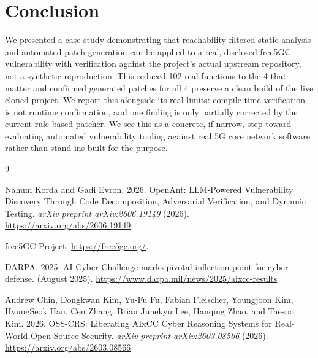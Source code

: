\documentclass[sigconf]{acmart}
\begin{document}
\section{Conclusion}

We presented a case study demonstrating that reachability-filtered
static analysis and automated patch generation can be applied to a
real, disclosed free5GC vulnerability with verification against the
project's actual upstream repository, not a synthetic reproduction.
This reduced 102 real functions to the 4 that matter and confirmed
generated patches for all 4 preserve a clean build of the live cloned
project. We report this alongside its real limits: compile-time
verification is not runtime confirmation, and one finding is only
partially corrected by the current rule-based patcher. We see this as
a concrete, if narrow, step toward evaluating automated vulnerability
tooling against real 5G core network software rather than stand-ins
built for the purpose.

\begin{thebibliography}{9}

Nahum Korda and Gadi Evron. 2026. OpenAnt: LLM-Powered Vulnerability
Discovery Through Code Decomposition, Adversarial Verification, and
Dynamic Testing. \textit{arXiv preprint arXiv:2606.19149} (2026).
\url{https://arxiv.org/abs/2606.19149}

free5GC Project. \url{https://free5gc.org/}.

DARPA. 2025. AI Cyber Challenge marks pivotal inflection point for
cyber defense. (August 2025).
\url{https://www.darpa.mil/news/2025/aixcc-results}

Andrew Chin, Dongkwan Kim, Yu-Fu Fu, Fabian Fleischer, Youngjoon Kim,
HyungSeok Han, Cen Zhang, Brian Junekyu Lee, Hanqing Zhao, and Taesoo
Kim. 2026. OSS-CRS: Liberating AIxCC Cyber Reasoning Systems for
Real-World Open-Source Security. \textit{arXiv preprint
arXiv:2603.08566} (2026). \url{https://arxiv.org/abs/2603.08566}

\end{thebibliography}
\end{document}
